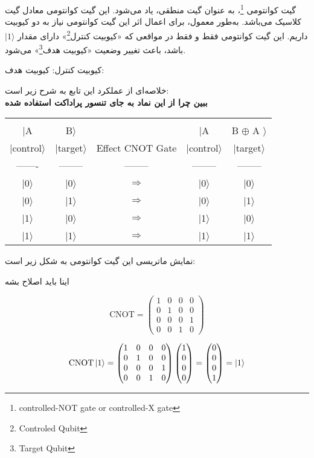 \documentclass{book}
\begin{document}
گیت کوانتومی \footnote{ controlled-NOT gate or controlled-X gate}، به عنوان گیت منطقی، یاد می‌شود. این گیت کوانتومی معادل گیت  کلاسیک می‌باشد.
به‌طور معمول، برای اعمال اثر این گیت کوانتومی نیاز به دو کیوبیت داریم. این گیت کوانتومی فقط و فقط در مواقعی که «کیوبیت کنترل\footnote{Controled Qubit}» دارای مقدار $\vert 1 \rangle$ باشد، باعث تغییر وضعیت «کیوبیت هدف\footnote{Target Qubit}» می‌شود.

کیوبیت کنترل:
کیوبیت هدف:

خلاصه‌ای از عملکرد این تابع به شرح زیر است:\\
\textbf{ببین چرا از این نماد به جای تنسور پراداکت استفاده شده}
\begin{latin}
\begin{tabular}{ccccc}
	&&&&\\
	|A & B$\rangle$ &	&  |A &B $\oplus$ A $\rangle$  \\
	|control$\rangle$ & |target$\rangle$ & Effect CNOT Gate &|control$\rangle$ & |target$\rangle$ \\
	------- & -------- & -------- & -------- & --------  \\
	|0$\rangle$ & |0$\rangle$ & $\Longrightarrow$ &|0$\rangle$ & |0$\rangle$ \\
	|0$\rangle$ & |1$\rangle$ & $\Longrightarrow$ &|0$\rangle$ & |1$\rangle$ \\
	|1$\rangle$ & |0$\rangle$ & $\Longrightarrow$ &|1$\rangle$ & |0$\rangle$ \\
	|1$\rangle$ & |1$\rangle$ & $\Longrightarrow$ &|1$\rangle$ & |1$\rangle$
\end{tabular}
\end{latin}



نمایش ماتریسی این گیت کوانتومی به شکل زیر است:



اینا باید اصلاح بشه

$$
\text{CNOT} = \begin{pmatrix}
	1 & 0 & 0 & 0 \\
	0 & 1 & 0 & 0 \\
	0 & 0 & 0 & 1 \\
	0 & 0 & 1 & 0
\end{pmatrix}
$$



$$
\text{CNOT} \ket{1} = \begin{pmatrix}
	1 & 0 & 0 & 0 \\
	0 & 1 & 0 & 0 \\
	0 & 0 & 0 & 1 \\
	0 & 0 & 1 & 0
\end{pmatrix} \begin{pmatrix}
	1 \\
	0 \\
	0 \\
	0
\end{pmatrix} = \begin{pmatrix}
	0 \\
	0 \\
	0 \\
	1
\end{pmatrix} = \ket{1}
$$
\end{document}
